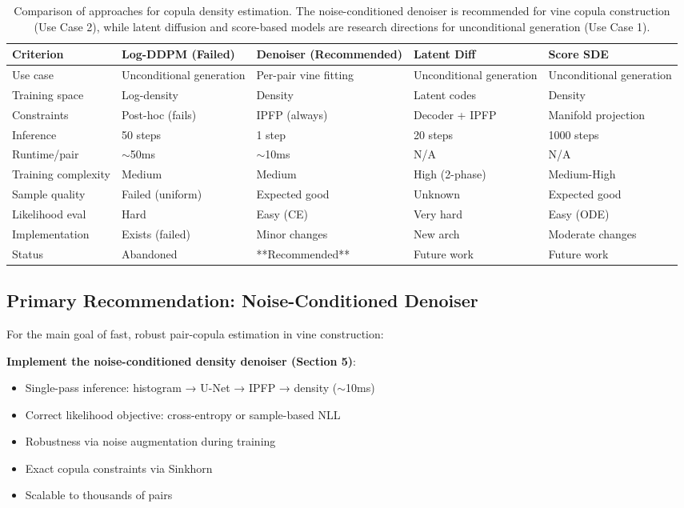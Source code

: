 \documentclass[11pt]{article}
\begin{document}
\begin{table}[H]
\centering
\small
\begin{tabular}{lp{2.8cm}p{2.8cm}p{2.8cm}p{2.8cm}}
\hline
\textbf{Criterion} & \textbf{Log-DDPM (Failed)} & \textbf{Denoiser (Recommended)} & \textbf{Latent Diff} & \textbf{Score SDE} \\
\hline
Use case & Unconditional generation & Per-pair vine fitting & Unconditional generation & Unconditional generation \\
\hline
Training space & Log-density & Density & Latent codes & Density \\
\hline
Constraints & Post-hoc (fails) & IPFP (always) & Decoder + IPFP & Manifold projection \\
\hline
Inference & 50 steps & 1 step & 20 steps & 1000 steps \\
\hline
Runtime/pair & $\sim$50ms & $\sim$10ms & N/A & N/A \\
\hline
Training complexity & Medium & Medium & High (2-phase) & Medium-High \\
\hline
Sample quality & Failed (uniform) & Expected good & Unknown & Expected good \\
\hline
Likelihood eval & Hard & Easy (CE) & Very hard & Easy (ODE) \\
\hline
Implementation & Exists (failed) & Minor changes & New arch & Moderate changes \\
\hline
Status & Abandoned & **Recommended** & Future work & Future work \\
\hline
\end{tabular}
\caption{Comparison of approaches for copula density estimation. The noise-conditioned denoiser is recommended for vine copula construction (Use Case 2), while latent diffusion and score-based models are research directions for unconditional generation (Use Case 1).}
\end{table}

\subsection{Primary Recommendation: Noise-Conditioned Denoiser}

For the main goal of fast, robust pair-copula estimation in vine construction:

\textbf{Implement the noise-conditioned density denoiser (Section 5)}:
\begin{itemize}
    \item Single-pass inference: histogram → U-Net → IPFP → density ($\sim$10ms)
    \item Correct likelihood objective: cross-entropy or sample-based NLL
    \item Robustness via noise augmentation during training
    \item Exact copula constraints via Sinkhorn
    \item Scalable to thousands of pairs
\end{itemize}
\end{document}
